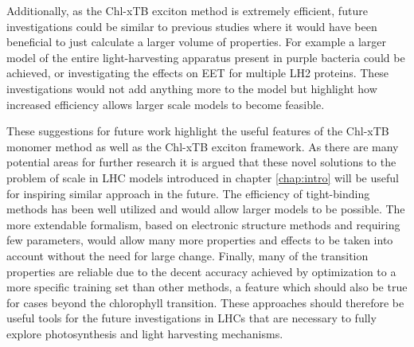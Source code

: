 Additionally, as the Chl-xTB exciton method is extremely efficient, future investigations
could be similar to previous studies where it would have been beneficial to just 
calculate a larger volume of properties. For example a larger model of the entire
light-harvesting apparatus present in purple bacteria could be achieved, or investigating
the effects on EET for multiple LH2 proteins. These investigations would not add
anything more to the model but highlight how increased efficiency allows larger
scale models to become feasible.

These suggestions for future work highlight the useful features of the Chl-xTB monomer
method as well as the Chl-xTB exciton framework. As there are many potential areas
for further research it is argued that these novel solutions to the problem of scale
in LHC models introduced in chapter \ref{chap:intro} will be useful for inspiring
similar approach in the future. The efficiency of tight-binding methods has been
well utilized and would allow larger models to be possible. The more extendable
formalism, based on electronic structure methods and requiring few parameters, would
allow many more properties and effects to be taken into account without the need
for large change. Finally, many of the transition properties are reliable due to
the decent accuracy achieved by optimization to a more specific training set than
other methods, a feature which should also be true for cases beyond the \Qy chlorophyll
transition. These approaches should therefore be useful tools for the future investigations
in LHCs that are necessary to fully explore photosynthesis and light harvesting
mechanisms. 